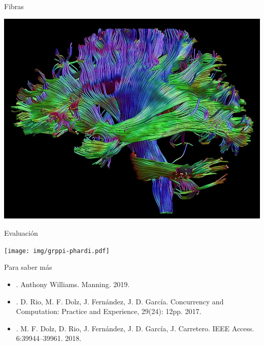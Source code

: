 \begin{frame}[t]{Fibras}
\begin{center}
\includegraphics[width=.8\textwidth]{img/brain.png}
\end{center}
\end{frame}

\begin{frame}[t]{Evaluación}
\begin{center}
\texttt{[image: img/grppi-phardi.pdf]}
\end{center}
\end{frame}

\begin{frame}[t]{Para saber más}
\begin{itemize}
  \item {}.
        Anthony Williams.
        Manning. 2019.

  \item {}. 
        D. Rio, M. F. Dolz, J. Fernández, J. D. García. 
        Concurrency and Computation: Practice and Experience, 29(24): 12pp.
        2017.

  \item {}.
         M. F. Dolz, D. Rio, J. Fernández, J. D. García, J. Carretero. 
         IEEE Access. 6:39944–39961. 2018.
    
\end{itemize}
\end{frame}
